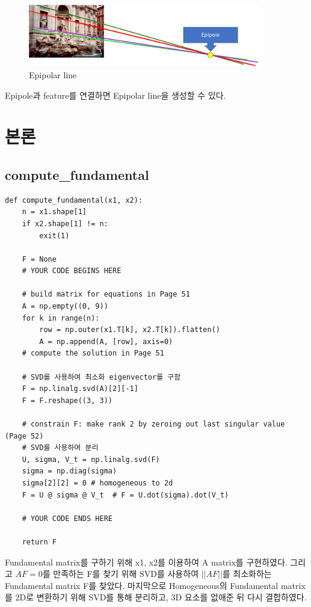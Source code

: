 \documentclass[]{report}
\begin{document}
\begin{figure}[ht!]
    \centering
    \includegraphics[width=0.9\textwidth]{image/epipolar_line.png}
    \caption{Epipolar line}
    \label{epipolarline}
\end{figure}

Epipole과 feature를 연결하면 Epipolar line을 생성할 수 있다. \\


\chapter{본론}

\section{compute\_fundamental}


\begin{lstlisting}
def compute_fundamental(x1, x2):
	n = x1.shape[1]
	if x2.shape[1] != n:
		exit(1)
	
	F = None
	# YOUR CODE BEGINS HERE
	
	# build matrix for equations in Page 51
	A = np.empty((0, 9))
	for k in range(n):
		row = np.outer(x1.T[k], x2.T[k]).flatten()
		A = np.append(A, [row], axis=0)
	# compute the solution in Page 51
	
	# SVD를 사용하여 최소화 eigenvector를 구함
	F = np.linalg.svd(A)[2][-1]
	F = F.reshape((3, 3))
	
	# constrain F: make rank 2 by zeroing out last singular value (Page 52)
	# SVD를 사용하여 분리
	U, sigma, V_t = np.linalg.svd(F)
	sigma = np.diag(sigma)
	sigma[2][2] = 0 # homogeneous to 2d
	F = U @ sigma @ V_t  # F = U.dot(sigma).dot(V_t)
	
	# YOUR CODE ENDS HERE
	
	return F
\end{lstlisting}

Fundamental matrix를 구하기 위해 x1, x2를 이용하여 A matrix를 구현하였다. 
그리고 $AF=0$를 만족하는 F를 찾기 위해 SVD를 사용하여 $||AF||$를 최소화하는 Fundamental matrix F를 찾았다. 
마지막으로 Homogeneous의 Fundamental matrix를 2D로 변환하기 위해 SVD를 통해 분리하고, 3D 요소를 없애준 뒤 다시 결합하였다. \\
\end{document}
